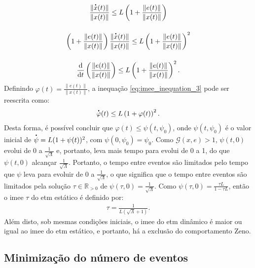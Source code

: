 \begin{gather}
  \frac{\|\dt{x}(t)\|}{\|x(t)\|} \leq L\left(1 + \frac{\|e(t)\|}{\|x(t)\|}\right) \notag \\[12pt]
  \left( 1 + \frac{\|e(t)\|}{\|x(t)\|} \right) \frac{\|\dt{x}(t)\|}{\|x(t)\|} \leq L\left( 1 + \frac{\|e(t)\|}{\|x(t)\|} \right) ^ 2 \notag \\[12pt]
  \frac{\mathrm{d}}{\mathrm{d}t}\left(\frac{\|e(t)\|}{\|x(t)\|}\right) \leq L\left( 1 + \frac{\|e(t)\|}{\|x(t)\|} \right) ^ 2.
  \label{eq:imee_inequation_3}
\end{gather} Definindo $\varphi (t) = \displaystyle \frac{\|e(t)\|}{\|x(t)\|}$, a inequação \eqref{eq:imee_inequation_3} pode ser reescrita como: \begin{equation}
  \dt{\varphi}(t) \leq L \left(1 + \varphi(t)\right)^2.
\end{equation} Desta forma, é possível concluir que $\varphi(t) \leq \psi(t, \psi_0)$, onde $\psi(t, \psi_0)$ é o valor inicial de $\dt{\psi} = L(1 + \psi(t))^2$, com $\psi(0, \psi_0) = \psi_0$. Como $\mathcal{G}(x, e) > 1$, $\psi(t, 0)$ evolui de 0 a $\frac{1}{\sqrt{\Lambda}}$ e, portanto, leva mais tempo para evolui de 0 a 1, do que $\psi(t, 0)$ alcançar $\frac{1}{\sqrt{\Lambda}}$. Portanto, o tempo entre eventos são limitados pelo tempo que $\psi$ leva para evoluir de 0 a $\frac{1}{\sqrt{\Lambda}}$, o que significa que o tempo entre eventos são limitados pela solução $\tau \in \mathbb{R}_{>0}$ de $\psi(\tau, 0) = \frac{1}{\sqrt{\Lambda}}$. Como $\psi(\tau, 0) = \frac{\tau L}{1 - \tau L}$, então o \acrshort{imee} $\tau$ do \acrshort{etm} estático é definido por: \begin{gather}
  \tau = \frac{1}{L(\sqrt{\Lambda} + 1)}.
  \label{eq:imee_final_inequation}
\end{gather} Além disto, sob mesmas condições iniciais, o \acrshort{imee} do \acrshort{etm} dinâmico é maior ou igual ao \acrshort{imee} do \acrshort{etm} estático, e portanto, há a exclusão do comportamento Zeno.

\subsection{Minimização do número de eventos}

